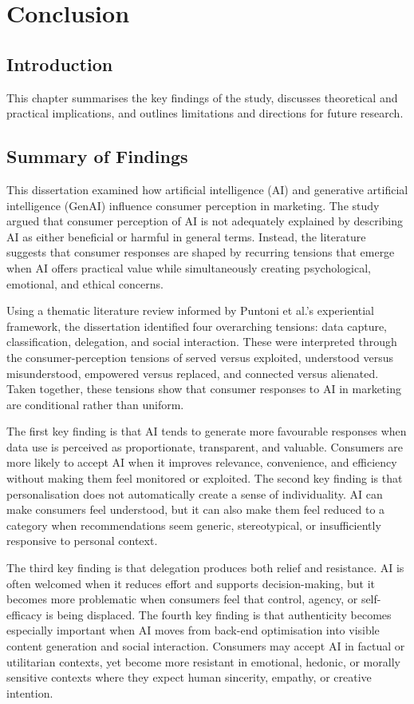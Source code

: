 \chapter{Conclusion}

\section{Introduction}
This chapter summarises the key findings of the study, discusses theoretical and practical implications, and outlines limitations and directions for future research.

\section{Summary of Findings}
This dissertation examined how artificial intelligence (AI) and generative artificial intelligence (GenAI) influence consumer perception in marketing. The study argued that consumer perception of AI is not adequately explained by describing AI as either beneficial or harmful in general terms. Instead, the literature suggests that consumer responses are shaped by recurring tensions that emerge when AI offers practical value while simultaneously creating psychological, emotional, and ethical concerns.

Using a thematic literature review informed by Puntoni et al.'s experiential framework, the dissertation identified four overarching tensions: data capture, classification, delegation, and social interaction. These were interpreted through the consumer-perception tensions of served versus exploited, understood versus misunderstood, empowered versus replaced, and connected versus alienated. Taken together, these tensions show that consumer responses to AI in marketing are conditional rather than uniform.

The first key finding is that AI tends to generate more favourable responses when data use is perceived as proportionate, transparent, and valuable. Consumers are more likely to accept AI when it improves relevance, convenience, and efficiency without making them feel monitored or exploited. The second key finding is that personalisation does not automatically create a sense of individuality. AI can make consumers feel understood, but it can also make them feel reduced to a category when recommendations seem generic, stereotypical, or insufficiently responsive to personal context.

The third key finding is that delegation produces both relief and resistance. AI is often welcomed when it reduces effort and supports decision-making, but it becomes more problematic when consumers feel that control, agency, or self-efficacy is being displaced. The fourth key finding is that authenticity becomes especially important when AI moves from back-end optimisation into visible content generation and social interaction. Consumers may accept AI in factual or utilitarian contexts, yet become more resistant in emotional, hedonic, or morally sensitive contexts where they expect human sincerity, empathy, or creative intention.

